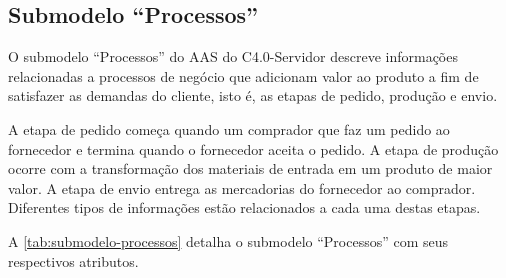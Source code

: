 \newpage

\subsection{Submodelo ``Processos''}

O submodelo ``Processos'' do AAS do C4.0-Servidor descreve informações relacionadas a processos de negócio que adicionam valor ao produto a fim de satisfazer as demandas do cliente, isto é, as etapas de pedido, produção e envio.

A etapa de pedido começa quando um comprador que faz um pedido ao fornecedor e termina quando o fornecedor aceita o pedido. A etapa de produção ocorre com a transformação dos materiais de entrada em um produto de maior valor. A etapa de envio entrega as mercadorias do fornecedor ao comprador. Diferentes tipos de informações estão relacionados a cada uma destas etapas.

A \autoref{tab:submodelo-processos} detalha o submodelo ``Processos'' com seus respectivos atributos.

